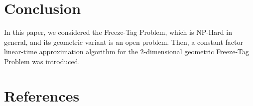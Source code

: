\documentclass[review]{elsarticle}
\begin{document}
\section{Conclusion}
In this paper, we considered the Freeze-Tag Problem, which is NP-Hard in general, and its geometric variant is an open problem. Then, a constant factor linear-time approximation algorithm for the 2-dimensional geometric Freeze-Tag Problem was introduced.

\section*{References}


\end{document}
